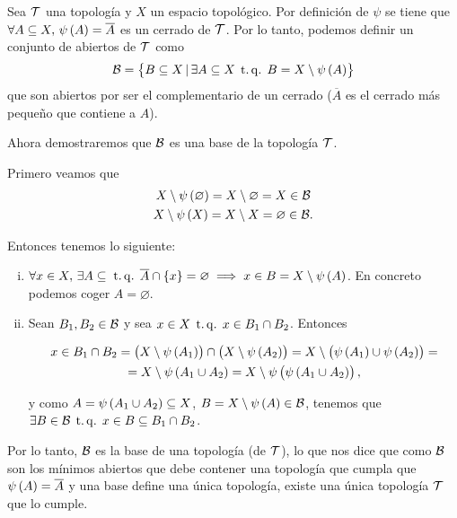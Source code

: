 \begin{eje}
  Sea $\mathcal{T}$ una topología y $X$ un espacio topológico. Por definición de $\psi$ se tiene que $\forall A\subseteq X,\, \psi\left( A\right) =\overline{A}$ es un cerrado de $\mathcal{T}$. Por lo tanto, podemos definir un conjunto de abiertos de $\mathcal{T}$ como
  \[
    \mathcal{B} = \left\{ B\subseteq X\, | \,\exists A \subseteq X \operatorname{\;t.q.\;} B=X\setminus \psi\left( A\right) \right\}
  \]
  que son abiertos por ser el complementario de un cerrado ($\overline{A}$ es el cerrado más pequeño que contiene a $A$).
  
  Ahora demostraremos que $\mathcal{B}$ es una base de la topología $\mathcal{T}$. 

  Primero veamos que
  \begin{gather*}
      X\setminus \psi\left( \varnothing\right) = X\setminus\varnothing = X \in \mathcal{B}\\
      X\setminus \psi\left( X\right) =X\setminus X = \varnothing \in \mathcal{B}.
  \end{gather*}
  
  Entonces tenemos lo siguiente:
  
  \begin{enumerate}[i)]
    \item $\forall x\in X,\, \exists A\subseteq \operatorname{\;t.q.\;} \overline{A}\cap\left\{ x\right\} = \varnothing \implies x\in B = X\setminus \psi\left( A\right)$.
    En concreto podemos coger $A=\varnothing$.
    \item Sean $B_1,B_2 \in \mathcal{B}$ y sea $x\in X \operatorname{\;t.q.\;} x\in B_1\cap B_2$. Entonces
    
    \begin{gather*}
	x\in B_1\cap B_2 = \left( X\setminus \psi\left( A_1\right) \right) \cap \left( X\setminus\psi\left( A_2\right) \right) = X\setminus \left(\psi\left( A_1\right)\cup\psi\left( A_2\right)\right) = \\
	= X\setminus\psi\left( A_1 \cup A_2\right) = X\setminus\psi\left(\psi\left( A_1 \cup A_2\right) \right),
    \end{gather*}
    
    y como $A=\psi\left( A_1\cup A_2\right) \subseteq X$, $B=X\setminus\psi\left( A\right) \in \mathcal{B}$, tenemos que $\exists B \in \mathcal{B} \operatorname{\;t.q.\;} x\in B \subseteq B_1 \cap B_2$.
  \end{enumerate}
  
  Por lo tanto, $\mathcal{B}$ es la base de una topología (de $\mathcal{T}$), lo que nos dice que como $\mathcal{B}$ son los mínimos abiertos que debe contener una topología que cumpla que $\psi\left( A\right) = \overline{A}$ y una base define una única topología, existe una única topología $\mathcal{T}$ que lo cumple. 
\end{eje}

